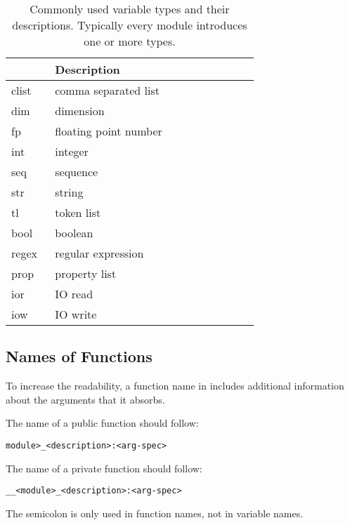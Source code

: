\documentclass{ltugboat}
\begin{document}
\begin{table}[htpb]
\centering
\begin{tabular}{>{\ttfamily\centering}p{0.15\linewidth}p{0.7\linewidth}}
\toprule
\multicolumn{1}{c}{Type} & Description\\ \midrule
clist & comma separated list\\
dim & dimension\\
fp & floating point number\\
int & integer\\
seq & sequence\\
str & string\\
tl & token list\\
bool & boolean\\
regex & regular expression\\
prop & property list\\
ior & IO read\\
iow & IO write\\ \bottomrule
\end{tabular}
\caption{Commonly used variable types and their descriptions. Typically every \LTT{} module introduces one or more types.}
\label{tbl:var-type}
\end{table}

\subsection{Names of Functions}

To increase the readability, a function name in \LTT{} includes additional information about the arguments that it absorbs. 

\vspace*{0.5\baselineskip}
\par\noindent
The name of a public \LTT{} function should follow:
\begin{center}
\texttt{\string\<module>\_<description>:<arg-spec>}
\end{center}
The name of a private \LTT{} function should follow:
\begin{center}
\texttt{\string\_\_<module>\_<description>:<arg-spec>}
\end{center}
The semicolon is only used in \LTT{} function names, not in variable names.
\end{document}
